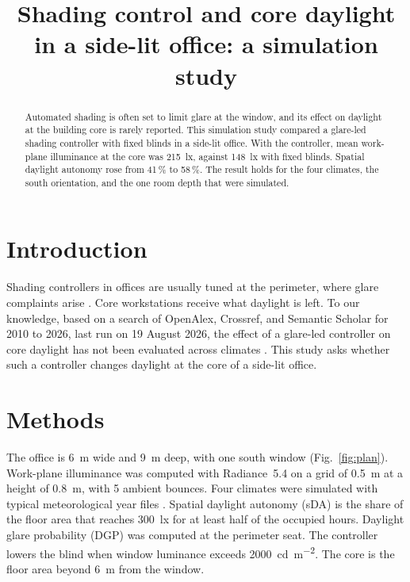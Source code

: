 \documentclass{article}
\begin{document}
\title{Shading control and core daylight in a side-lit office: a simulation study}
\maketitle

\begin{abstract}
Automated shading is often set to limit glare at the window, and its effect on daylight
at the building core is rarely reported. This simulation study compared a glare-led
shading controller with fixed blinds in a side-lit office. With the controller, mean
work-plane illuminance at the core was \SI{215}{\lux}, against \SI{148}{\lux} with fixed
blinds. Spatial daylight autonomy rose from 41\,\% to 58\,\%. The result holds for the
four climates, the south orientation, and the one room depth that were simulated.
\end{abstract}

\section{Introduction}
\label{sec:intro}
Shading controllers in offices are usually tuned at the perimeter, where glare
complaints arise \cite{smith2021,lee2022}. Core workstations receive what daylight is
left. To our knowledge, based on a search of OpenAlex, Crossref, and Semantic Scholar
for 2010 to 2026, last run on 19 August 2026, the effect of a glare-led controller on
core daylight has not been evaluated across climates \cite{okafor2020}. This study asks whether such a controller changes daylight at the
core of a side-lit office.

\section{Methods}
\label{sec:methods}
The office is \SI{6}{\metre} wide and \SI{9}{\metre} deep, with one south window
(Fig.~\ref{fig:plan}). Work-plane illuminance was computed with Radiance~5.4 on a grid
of \SI{0.5}{\metre} at a height of \SI{0.8}{\metre}, with 5 ambient bounces. Four
climates were simulated with typical meteorological year files \cite{cen2019}. Spatial
daylight autonomy (sDA) is the share of the floor area that reaches \SI{300}{\lux} for
at least half of the occupied hours. Daylight glare probability (DGP) was computed at
the perimeter seat. The controller lowers the blind when window luminance exceeds
\SI{2000}{\candela\per\metre\squared}. The core is the floor area beyond \SI{6}{\metre}
from the window.
\end{document}
